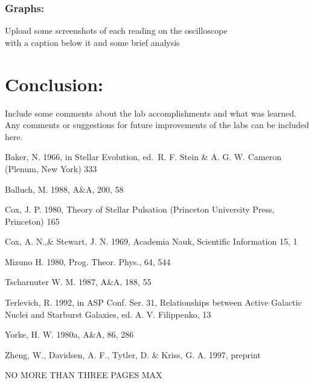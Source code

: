 \documentclass[10pt,a4paper,draft]{article}
\begin{document}
\section{Graphs:}
Upload some screenshots of each reading on the oscilloscope \\
with a caption below it and some brief analysis






\part*{Conclusion:}
Include some comments  about   the lab accomplishments and what was learned. Any comments or suggestions for future improvements of the labs can be included here.


\begin{thebibliography}{}

   Baker, N. 1966,
      in Stellar Evolution,
      ed.\ R. F. Stein \& A. G. W. Cameron
      (Plenum, New York) 333

    Balluch, M. 1988,
      A\&A, 200, 58

    Cox, J. P. 1980,
      Theory of Stellar Pulsation
      (Princeton University Press, Princeton) 165

    Cox, A. N.,\& Stewart, J. N. 1969,
      Academia Nauk, Scientific Information 15, 1

    Mizuno H. 1980,
      Prog. Theor. Phys., 64, 544
   
    Tscharnuter W. M. 1987,
      A\&A, 188, 55
  
    Terlevich, R. 1992, in ASP Conf. Ser. 31, 
      Relationships between Active Galactic Nuclei and Starburst Galaxies, 
      ed. A. V. Filippenko, 13

    Yorke, H. W. 1980a,
      A\&A, 86, 286

    Zheng, W., Davidsen, A. F., Tytler, D. \& Kriss, G. A.
      1997, preprint
\end{thebibliography}

{\Large NO MORE THAN THREE PAGES MAX }
\end{document}
